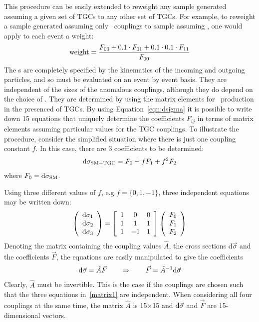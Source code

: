 This procedure can be easily extended to reweight any sample generated assuming
a given set of TGCs to any other set of TGCs. For example, to reweight a sample
generated assuming only \sm\ couplings to sample assuming , one would
apply to each event a weight:
\begin{eqnarray}\label{revisit}
{\rm weight} = \frac{F_{00} + 0.1 \cdot  F_{01} + 0.1\cdot 0.1 \cdot
F_{11}}{F_{00}}
\end{eqnarray}
The \Fij s are completely
specified by the kinematics of the incoming and outgoing particles, and so must
be evaluated on an event by event basis. They are
independent of the sizes of the anomalous couplings, although they do depend on
the choice of \formfactor. They are determined by using the matrix elements for
\ZZllll\ production in the presenced of TGCs. By using Equation~\ref{eqn:dsigma} it 
is possible to write down 15 equations that uniquely determine the 
coefficients $F_{ij}$ in terms of matrix elements assuming particular values
for the TGC couplings.
To illustrate the procedure, consider the simplified situation where 
there is just one coupling constant $f$. In this case, there are 3 coefficients 
to be determined:
\begin{eqnarray}\label{revisit2}
{\rm d}\sigma_{\rm SM+TGC} = F_0 + fF_1 + f^2F_2 
\end{eqnarray}
where  $F_0={\rm d}\sigma_{\rm SM}$.

Using three different values of $f$, e.g $f=\{0,1,-1\}$, three independent
equations may be written down:
\begin{eqnarray}\label{matrix1}
\left(\begin{array}{c}
{\rm d}\sigma_1\\
{\rm d}\sigma_2\\
{\rm d}\sigma_3
\end{array}\right) =
\left[\begin{array}{ccc}
1 & 0 & 0 \\
1 & 1 & 1 \\
1 & -1 & 1
\end{array}\right]
\left(\begin{array}{c}
F_0\\
F_1\\
F_2
\end{array}\right)
\end{eqnarray}
Denoting the matrix containing the coupling values $\hat{A}$, the cross sections
d$\vec{\sigma}$ and the coefficients $\vec{F}$, the equations are easily
manipulated to give the coefficients 
\begin{eqnarray}\label{matrix2} {\rm
d}\vec{\sigma}=\hat{A}\vec{F} \qquad \Rightarrow \qquad \vec{F}=\hat{A}^{-1}{\rm
d}\vec{\sigma} 
\end{eqnarray} 
Clearly, $\hat{A}$ must be invertible. This is the
case if the couplings are chosen such that the three equations in~\ref{matrix1}
are independent. When considering all four couplings at the same time, the
matrix $\hat{A}$ is 15$\times$15 and ${\rm d}\vec{\sigma}$ and $\vec{F}$ are
15-dimensional vectors.

